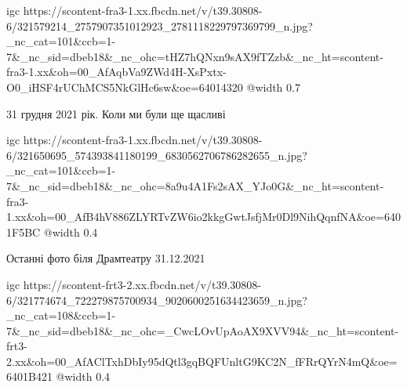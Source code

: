\ifcmt
  igc https://scontent-fra3-1.xx.fbcdn.net/v/t39.30808-6/321579214_2757907351012923_2781118229797369799_n.jpg?_nc_cat=101&ccb=1-7&_nc_sid=dbeb18&_nc_ohc=tHZ7hQNxn9sAX9fTZzb&_nc_ht=scontent-fra3-1.xx&oh=00_AfAqbVa9ZWd4H-XsPxtx-O0_iHSF4rUChMCS5NkGlHc6sw&oe=64014320
	@width 0.7
\fi


31 грудня 2021 рік. Коли ми були ще щасливі

\ifcmt
  igc https://scontent-fra3-1.xx.fbcdn.net/v/t39.30808-6/321650695_574393841180199_6830562706786282655_n.jpg?_nc_cat=101&ccb=1-7&_nc_sid=dbeb18&_nc_ohc=8a9u4A1Fs2sAX_YJo0G&_nc_ht=scontent-fra3-1.xx&oh=00_AfB4hV886ZLYRTvZW6io2kkgGwtJsfjMr0Dl9NihQqnfNA&oe=6401F5BC
	@width 0.4
\fi


Останні фото біля Драмтеатру 31.12.2021

\ifcmt
  igc https://scontent-frt3-2.xx.fbcdn.net/v/t39.30808-6/321774674_722279875700934_9020600251634423659_n.jpg?_nc_cat=108&ccb=1-7&_nc_sid=dbeb18&_nc_ohc=_CwcLOvUpAoAX9XVV94&_nc_ht=scontent-frt3-2.xx&oh=00_AfAClTxhDbIy95dQtl3gqBQFUnltG9KC2N_fFRrQYrN4mQ&oe=6401B421
	@width 0.4
\fi

